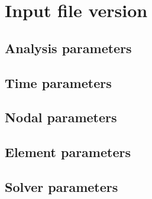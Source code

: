 
\section{Input file version }
\label{sect.inputfile}
\subsection{Analysis parameters}
\subsection{Time parameters}
\label{sect.time.parameters}
\subsection{Nodal parameters}
\subsection{Element parameters}
\subsection{Solver parameters}

